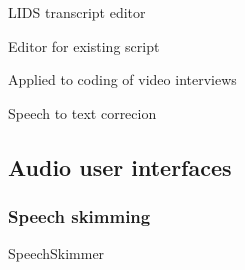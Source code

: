 LIDS transcript editor \citep{Apperley2002}

Editor for existing script \citep{Shin2016}

Applied to coding of video interviews \cite{Chandrasegaran2017}

Speech to text correcion 
\citep{Burke2006}
\citep{Liang2014}
\citep{Suhm2001}
\citep{Wald2007}







\subsection{Audio user interfaces}

\subsubsection{Speech skimming}
SpeechSkimmer \citep{Arons1997}

